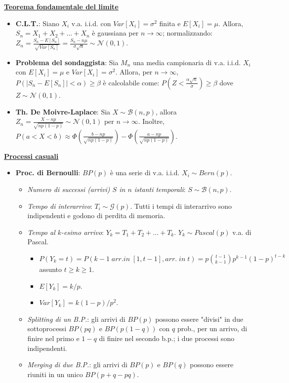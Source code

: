 \documentclass[8pt]{extarticle}
\begin{document}
\begin{multicols*}{3}
    \textbf{\underline{Teorema fondamentale del limite}}
    \begin{itemize}
        \item \textbf{C.L.T.}: Siano $X_{i}$ v.a. i.i.d. con $Var[X_{i}]=\sigma^{2}$ finita e $E[X_{i}]=\mu$. Allora, $S_{n}=X_{1}+X_{2}+...+X_{n}$ è gaussiana per $n\rightarrow\infty$; normalizzando: $Z_{n}=\frac{S_{n}-E[S_{n}]}{\sqrt{Var[S_{n}]}}=\frac{S_{n}-n\mu}{\sigma\sqrt{n}}\sim\mathcal{N}(0,1)$.
        \item \textbf{Problema del sondaggista}: Sia $M_{n}$ una media campionaria di v.a. i.i.d. $X_{i}$ con $E[X_{i}]=\mu$ e $Var[X_{i}]=\sigma^{2}$. Allora, per $n\rightarrow\infty$, $P(|S_{n}-E[S_{n}]|<\alpha)\ge\beta$ è calcolabile come: $P\left(Z<\frac{\alpha\sqrt{n}}{\sigma}\right)\ge\beta$ dove $Z\sim\mathcal{N}(0,1)$.
        \item \textbf{Th. De Moivre-Laplace}: Sia $X\sim\mathcal{B}(n,p)$, allora $Z_{n}=\frac{X-np}{\sqrt{np(1-p)}}\sim\mathcal{N}(0,1)$ per $n\rightarrow\infty$. Inoltre, $P(a<X<b)\approx\Phi\left(\frac{b-np}{\sqrt{np(1-p)}}\right)-\Phi\left(\frac{a-np}{\sqrt{np(1-p)}}\right)$.
    \end{itemize}

    \textbf{\underline{Processi casuali}}
    \begin{itemize}
        \item \textbf{Proc. di Bernoulli}: $BP(p)$ è una serie di v.a. i.i.d. $X_{i}\sim Bern(p)$.
              \begin{itemize}
                  \item \textit{Numero di successi (arrivi) $S$ in $n$ istanti temporali}: $S\sim\mathcal{B}(n,p)$.
                  \item \textit{Tempo di interarrivo}: $T_{i}\sim\mathcal{G}(p)$. Tutti i tempi di interarrivo sono indipendenti e godono di perdita di memoria.
                  \item \textit{Tempo al $k$-esimo arrivo}: $Y_{k}=T_{1}+T_{2}+...+T_{k}$. $Y_{k}\sim Pascal(p)$ v.a. di Pascal.
                        \begin{itemize}
                            \item $P(Y_{k}=t)=P(k-1\; arr. in\; [1, t-1], arr.\; in\; t)=p\binom{t-1}{k-1}p^{k-1}(1-p)^{t-k}$ assunto $t\ge k\ge 1$.
                            \item $E[Y_{k}]=k/p$.
                            \item $Var[Y_{k}]=k(1-p)/p^{2}$.
                        \end{itemize}
                  \item \textit{Splitting di un B.P.}: gli arrivi di $BP(p)$ possono essere "divisi" in due sottoprocessi $BP(pq)$ e $BP(p(1-q))$ con $q$ prob., per un arrivo, di finire nel primo e $1-q$ di finire nel secondo b.p.; i due processi sono indipendenti.
                  \item \textit{Merging di due B.P.}: gli arrivi di $BP(p)$ e $BP(q)$ possono essere riuniti in un unico $BP(p+q-pq)$.
              \end{itemize}
    \end{itemize}

\end{multicols*}
\end{document}
